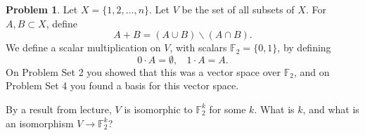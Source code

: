 \documentclass[12pt,reqno]{article}
\theoremstyle{definition}
\newtheorem{problem}{Problem}
\begin{document}
\newpage


\begin{problem}
    Let $X = \{1,2,\ldots,n\}$. Let $V$ be the set of all subsets of $X$. For $A,B \subset X$, define 
    $$
    A + B = (A \cup B) \backslash (A \cap B).
    $$
    We define a scalar multiplication on $V$, with scalars $\mathbb{F}_2 = \{0,1\}$, by defining
    $$
    0 \cdot A = \emptyset,\ \ \ \ 1 \cdot A = A.
    $$
    On Problem Set 2 you showed that this was a vector space over $\mathbb{F}_2$, and on Problem Set 4 you found a basis for this vector space. 
    
    By a result from lecture, $V$ is isomorphic to $\mathbb{F}_2^k$ for some $k$. What is $k$, and what is an isomorphism $V \rightarrow \mathbb{F}_2^k$?
\end{problem}
\end{document}
